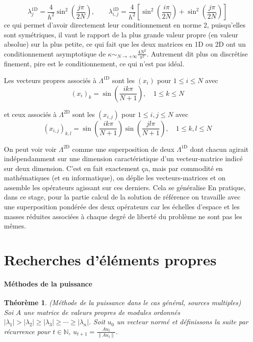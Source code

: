 \documentclass[svgnames,dvipsnames,a4paper,10pt,french]{report}
\newtheorem{theorem}{Théorème}[section]
\begin{document}
\begin{appendices}
\begin{equation}
    \lambda^{\text{1D}}_j = \frac{4}{h^2} \sin^2\left( \frac{j\pi}{2N} \right), \qquad  \lambda^{\text{1D}}_{i,j} = \frac{4}{h^2} \left[ \sin^2\left( \frac{i\pi}{2N} \right) + \sin^2\left( \frac{j\pi}{2N} \right)\right]
\end{equation}
ce qui permet d'avoir directement leur conditionnement en norme 2, puisqu'elles sont symétriques, il vaut le rapport de la plus grande valeur propre (en valeur absolue) sur la plus petite, ce qui fait que les deux matrices en 1D ou 2D ont un conditionnement asymptotique de $\kappa \sim_{N \rightarrow + \infty} \frac{4N^2}{\pi^2}$. Autrement dit plus on discrétise finement, pire est le conditionnement, ce qui n'est pas idéal.


Les vecteurs propres associés à $\Lambda^{\text{1D}}$ sont les $(x_i)$ pour $1\le i \le N$ avec
\begin{equation}
    (x_i)_k = \sin \left(\frac{ik\pi}{N+1}\right), \quad 1\le  k\le N
\end{equation}

et ceux associés à $\Lambda^{\text{2D}}$ sont les $(x_{i,j})$ pour $1\le i,j \le N$ avec
\begin{equation}
    (x_{i,j})_{k,l} = \sin \left(\frac{ik\pi}{N+1} \right) \sin \left(\frac{jl\pi}{N+1} \right), \quad 1\le  k,l\le N
\end{equation}

On peut voir voir $\Lambda^{\text{2D}}$ comme une \og superposition \fg{} de deux $\Lambda^{\text{1D}}$ dont chacun agirait indépendamment sur une dimension caractéristique d'un vecteur-matrice indicé sur deux dimension. C'est en fait exactement ça, mais par commodité en mathématiques (et en informatique), on déplie les vecteurs-matrices et on assemble les opérateurs agissant sur ces derniers. Cela se généralise En pratique, dans ce stage, pour la partie calcul de la solution de référence on travaille avec une superposition pondérée des deux opérateurs car les échelles d'espace et les masses réduites associées à chaque degré de liberté du problème ne sont pas les mêmes.


\section{Recherches d'éléments propres}


\paragraph{Méthodes de la puissance}
\begin{theorem}{(Méthode de la puissance dans le cas général, sources multiples)}
Soi $A$ une matrice de valeurs propres de modules ordonnés $|\lambda_1| > |\lambda_2| \ge |\lambda_3| \ge \cdots \ge |\lambda_n|$. Soit $u_0$ un vecteur normé et définissons la suite par récurrence pour $t\in\mathbb{N}$,  $u_{t+1} = \frac{Au_t}{\|Au_t\|}$.


\end{theorem}
\end{appendices}
\end{document}
